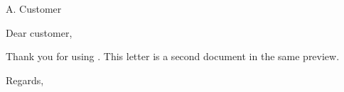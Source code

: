 \documentclass[11pt]{letter}
\begin{document}
\begin{letter}{A. Customer}
\opening{Dear customer,}
Thank you for using \brand. This letter is a second document in the same preview.
\closing{Regards,}
\end{letter}
\end{document}
